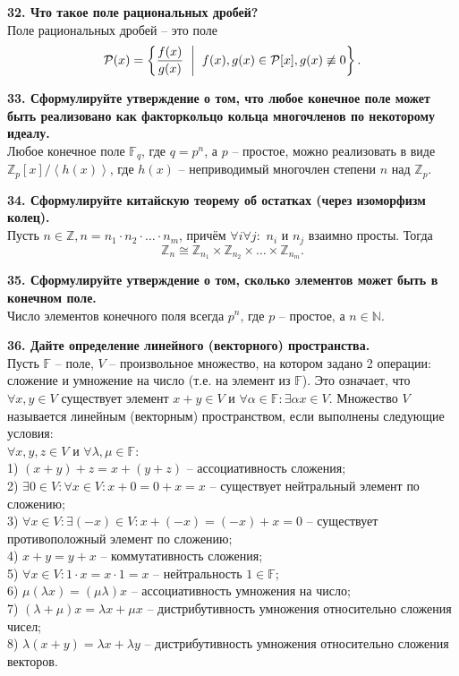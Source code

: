 \documentclass[11pt,a4paper]{article}
\newcommand{\N}{\mathbb{N}}
\newcommand{\Z}{\mathbb{Z}}
\newcommand{\F}{\mathbb{F}}
\renewcommand{\mid}{\hspace{2mm}\middle|\hspace{2mm}}
\begin{document}
\textbf{32. Что такое поле рациональных дробей?\\}
Поле рациональных дробей -- это поле $$\mathcal{P}(x) = \left\{ \frac{f(x)}{g(x)} \mid f(x), g(x) \in \mathcal{P}[x], g(x) \not\equiv 0 \right\}.$$

\textbf{33. Сформулируйте утверждение о том, что любое конечное поле может быть реализовано как факторкольцо кольца многочленов по некоторому идеалу.\\}
Любое конечное поле $\F_{q}$, где $q = p^n$, а $p$ -- простое, можно реализовать в виде $\Z_p[x] / \left\langle h(x) \right\rangle$, где $h(x)$ -- неприводимый многочлен степени $n$ над $\Z_p$.

\textbf{34. Сформулируйте китайскую теорему об остатках (через изоморфизм колец).\\}
Пусть $n \in \Z, n = n_1 \cdot n_2 \cdot \hdots \cdot n_m$, причём $\forall i \forall j:$ $n_i$ и $n_j$ взаимно просты. Тогда $$\Z_n \cong \Z_{n_1} \times \Z_{n_2} \times \hdots \times \Z_{n_m}.$$

\textbf{35. Сформулируйте утверждение о том, сколько элементов может быть в конечном поле.\\}
Число элементов конечного поля всегда $p^n$, где $p$ -- простое, а $n \in \N$.

\textbf{36. Дайте определение линейного (векторного) пространства.\\}
Пусть $\F$ -- поле, $V$ -- произвольное множество, на котором задано 2 операции: сложение и умножение на число (т.е. на элемент из $\F$). Это означает, что $\forall x, y \in V$ существует элемент $x + y \in V$ и $\forall \alpha \in \F: \exists \alpha x \in V$. Множество $V$ называется линейным (векторным) пространством, если выполнены следующие условия:\\
$\forall x, y, z \in V$ и $\forall \lambda, \mu \in \F$:\\
1) $(x + y) + z = x + (y + z)$ -- ассоциативность сложения;\\
2) $\exists 0 \in V: \forall x \in V: x + 0 = 0 + x = x$ -- существует нейтральный элемент по сложению;\\
3) $\forall x \in V: \exists(-x) \in V: x + (-x) = (-x) + x = 0$ -- существует противоположный элемент по сложению;\\
4) $x + y = y + x$ -- коммутативность сложения;\\
5) $\forall x \in V: 1 \cdot x = x \cdot 1 = x$ -- нейтральность $1 \in \F$;\\
6) $\mu( \lambda x ) = ( \mu \lambda )x$ -- ассоциативность умножения на число;\\
7) $( \lambda + \mu )x = \lambda x + \mu x$ -- дистрибутивность умножения относительно сложения чисел;\\
8) $\lambda (x + y) = \lambda x + \lambda y$ -- дистрибутивность умножения относительно сложения векторов.
\end{document}
